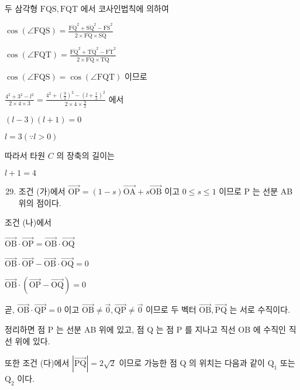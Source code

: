 \documentclass[10pt]{article}
\begin{document}
두 삼각형 \(\mathrm{FQS}, \mathrm{FQT}\) 에서 코사인법칙에 의하여

\(\cos (\angle \mathrm{FQS})=\frac{\overline{\mathrm{FQ}}^{2}+\overline{\mathrm{SQ}}^{2}-\overline{\mathrm{FS}}^{2}}{2 \times \overline{\mathrm{FQ}} \times \overline{\mathrm{SQ}}}\)

\(\cos (\angle \mathrm{FQT})=\frac{\overline{\mathrm{FQ}}^{2}+\overline{\mathrm{TQ}}^{2}-\overline{\mathrm{FT}}^{2}}{2 \times \overline{\mathrm{FQ}} \times \overline{\mathrm{TQ}}}\)

\(\cos (\angle \mathrm{FQS})=\cos (\angle \mathrm{FQT})\) 이므로

\(\frac{4^{2}+3^{2}-l^{2}}{2 \times 4 \times 3}=\frac{4^{2}+\left(\frac{9}{2}\right)^{2}-\left(l+\frac{1}{2}\right)^{2}}{2 \times 4 \times \frac{9}{2}}\) 에서

\((l-3)(l+1)=0\)

\(l=3(\because l>0)\)

따라서 타원 \(C\) 의 장축의 길이는

\(l+1=4\)

\begin{enumerate}
  \setcounter{enumi}{28}
  \item 조건 (가)에서 \(\overrightarrow{\mathrm{OP}}=(1-s) \overrightarrow{\mathrm{OA}}+s \overrightarrow{\mathrm{OB}}\) 이고 \(0 \leq s \leq 1\) 이므로 P 는 선분 AB 위의 점이다.
\end{enumerate}

조건 (나)에서

\(\overrightarrow{\mathrm{OB}} \cdot \overrightarrow{\mathrm{OP}}=\overrightarrow{\mathrm{OB}} \cdot \overrightarrow{\mathrm{OQ}}\)

\(\overrightarrow{\mathrm{OB}} \cdot \overrightarrow{\mathrm{OP}}-\overrightarrow{\mathrm{OB}} \cdot \overrightarrow{\mathrm{OQ}}=0\)

\(\overrightarrow{\mathrm{OB}} \cdot(\overrightarrow{\mathrm{OP}}-\overrightarrow{\mathrm{OQ}})=0\)

곧, \(\overrightarrow{\mathrm{OB}} \cdot \overrightarrow{\mathrm{QP}}=0\) 이고 \(\overrightarrow{\mathrm{OB}} \neq \overrightarrow{0}, \overrightarrow{\mathrm{QP}} \neq \overrightarrow{0}\) 이므로 두 벡터 \(\overrightarrow{\mathrm{OB}}, \overrightarrow{\mathrm{PQ}}\) 는 서로 수직이다.

정리하면 점 P 는 선분 AB 위에 있고, 점 Q 는 점 P 를 지나고 직선 OB 에 수직인 직선 위에 있다.

또한 조건 (다)에서 \(|\overrightarrow{\mathrm{PQ}}|=2 \sqrt{2}\) 이므로 가능한 점 Q 의 위치는 다음과 같이 \(\mathrm{Q}_{1}\) 또는 \(\mathrm{Q}_{2}\) 이다.
\end{document}
